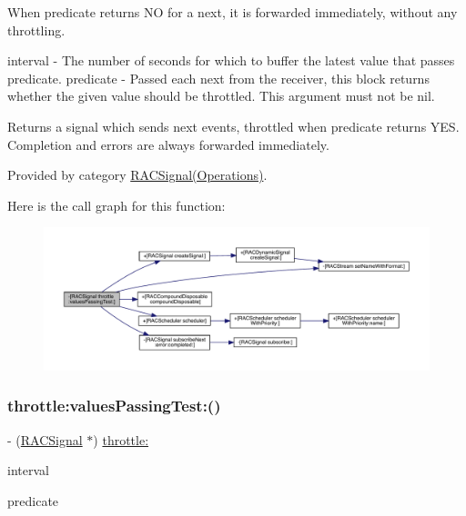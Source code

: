 When {\ttfamily predicate} returns NO for a {\ttfamily next}, it is forwarded immediately, without any throttling.

interval -\/ The number of seconds for which to buffer the latest value that passes {\ttfamily predicate}. predicate -\/ Passed each {\ttfamily next} from the receiver, this block returns whether the given value should be throttled. This argument must not be nil.

Returns a signal which sends {\ttfamily next} events, throttled when {\ttfamily predicate} returns Y\+ES. Completion and errors are always forwarded immediately. 

Provided by category \mbox{\hyperlink{category_r_a_c_signal_07_operations_08_a0310fbee83b4ca1b1daca25daf24f41b}{R\+A\+C\+Signal(\+Operations)}}.

Here is the call graph for this function\+:\nopagebreak
\begin{figure}[H]
\begin{center}
\leavevmode
\includegraphics[width=350pt]{interface_r_a_c_signal_a0310fbee83b4ca1b1daca25daf24f41b_cgraph}
\end{center}
\end{figure}
\mbox{\label{interface_r_a_c_signal_a0310fbee83b4ca1b1daca25daf24f41b}} 
\subsubsection{\texorpdfstring{throttle\+:values\+Passing\+Test\+:()}{throttle:valuesPassingTest:()}\hspace{0.1cm}{\footnotesize\ttfamily [3/3]}}
{\footnotesize\ttfamily -\/ (\mbox{\hyperlink{interface_r_a_c_signal}{R\+A\+C\+Signal}} $\ast$) \mbox{\hyperlink{category_r_a_c_signal_07_operations_08_a2542ae804d05ec734d0f4d2fa8c3ac93}{throttle\+:}} \begin{DoxyParamCaption}\item[{(N\+S\+Time\+Interval)}]{interval }\item[{valuesPassingTest:(B\+O\+OL($^\wedge$)(id next))}]{predicate }\end{DoxyParamCaption}}

